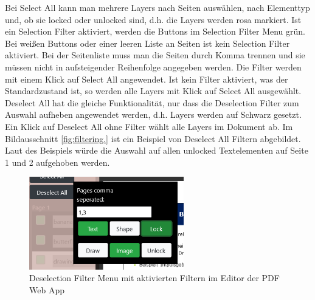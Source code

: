 Bei Select All kann man mehrere Layers nach Seiten auswählen, nach Elementtyp und, ob sie locked oder unlocked sind, d.h. die Layers werden rosa markiert. Ist ein Selection Filter aktiviert, werden die Buttons im Selection Filter Menu grün. Bei weißen Buttons oder einer leeren Liste an Seiten ist kein Selection Filter aktiviert. Bei der Seitenliste muss man die Seiten durch Komma trennen und sie müssen nicht in aufsteigender Reihenfolge angegeben werden. Die Filter werden mit einem Klick auf Select All angewendet. Ist kein Filter aktiviert, was der Standardzustand ist, so werden alle Layers mit Klick auf Select All ausgewählt. Deselect All hat die gleiche Funktionalität, nur dass die Deselection Filter zum Auswahl aufheben angewendet werden, d.h. Layers werden auf Schwarz gesetzt. Ein Klick auf Deselect All ohne Filter wählt alle Layers im Dokument ab. Im Bildausschnitt \ref{fig:filtering.} ist ein Beispiel von Deselect All Filtern abgebildet. Laut des Beispiels würde die Auswahl auf allen unlocked Textelementen auf Seite 1 und 2 aufgehoben werden. 

\begin{figure}[!htbp]
	\centering
	\includegraphics[width=0.6\textwidth]{"images/filtering.png"}
	\caption{Deselection Filter Menu mit aktivierten Filtern im Editor der PDF Web App}
	\label{fig:filtering}
\end{figure}

